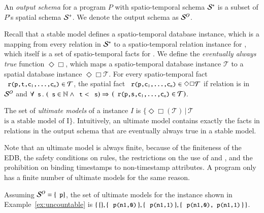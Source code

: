 An {\em output schema} for a \lang program $P$ with spatio-temporal schema
$\mathcal{S}^*$ is a subset of $P$'s spatial schema $\mathcal{S}^+$.  We denote the output schema as
$\mathcal{S}^O$.

Recall that a stable model defines a spatio-temporal database instance, which is a mapping from every relation  in $\mathcal{S}^*$ to a spatio-temporal relation instance for , which itself is a set of spatio-temporal facts for .  We define the {\em eventually always true} function $\Diamond\Box$, which maps a spatio-temporal database instance $\mathcal{T}$ to a spatial database instance $\Diamond\Box\mathcal{T}$.  For every spatio-temporal fact $\dedalus{r(p,t,c\sub{1},\ldots,c\sub{n})} \in \mathcal{T}$, the spatial fact $\dedalus{r(p,c\sub{1},\ldots,c\sub{n})} \in \Diamond\Box\mathcal{T}$ if relation  is in $\mathcal{S}^O$ and $\forall \dedalus{s}\, . \, \left(\dedalus{s} \in \mathbb{N} \land \dedalus{t} < \dedalus{s}\right) \Rightarrow$ \linebreak $\left(\dedalus{r(p,s,c\sub{1},\ldots,c\sub{n})} \in \mathcal{T}\right)$.

The set of {\em ultimate models} of a \lang instance $I$ is
$\{\Diamond\Box(\mathcal{T}) \, | \, \mathcal{T}$ $\text{is a stable model of
  I}\}$.  Intuitively, an ultimate model contains exactly the facts in relations
in the output schema that are eventually always true in a stable model.

Note that an ultimate model is always finite, because of the finiteness of the EDB, the safety conditions on rules, the restrictions on the use of  and , and the prohibition on binding timestamps to non-timestamp attributes.  A \lang program only has a finite number of ultimate models for the same reason.

\begin{example}
Assuming $\oschema = \{\dedalus{p}\}$, the set of ultimate models for the \lang instance shown in Example~\ref{ex:uncountable} is \linebreak $\{ \, \{\}, \{ \, \dedalus{p(n1,0)} \, \}, \{ \, \dedalus{p(n1,1)} \, \}, \{ \, \dedalus{p(n1,0), p(n1,1)} \, \} \, \}$.
\end{example}



